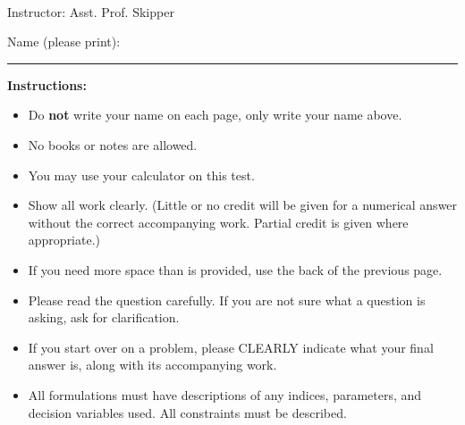 \documentclass[12pt]{article}
\begin{document}


\newpage

 \pagestyle{empty}



\noindent



 \\

\smskip

\noindent
{\sc Instructor:  Asst. Prof. Skipper}

\vspace{1.0cm}
\noindent
Name (please print): \ \ \rule{6cm}{.1mm}  \quad  
\vspace{1cm}


\noindent
{\bf Instructions:}
\\
\begin{itemize}
\item Do {\bf not} write your name on each page, only write your name above.

\item No books or notes %
 are allowed. %

\item You may use your calculator on this test.

\item Show all work clearly. (Little or no credit will be given for a numerical
answer without the correct accompanying work.
Partial credit is given where appropriate.) 

\item If you need more space than is provided, use the back of the previous page. 

\item Please read the question carefully.
If you are not sure what a question is
asking, ask for clarification.

\item If you start over on a problem, please CLEARLY indicate what your final
  answer is, along with its accompanying work.

\item All formulations must have descriptions of any indices, parameters, and decision variables used. All constraints must be described. 
\end{itemize}
\end{document}
